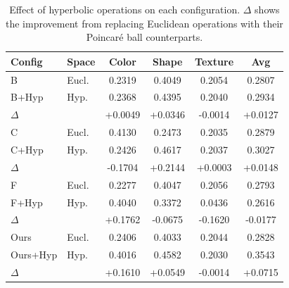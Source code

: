 \begin{table}[t]
\centering
\caption{Effect of hyperbolic operations on each configuration. $\Delta$ shows the improvement from replacing Euclidean operations with their Poincar\'{e} ball counterparts.}
\label{tab:hyperbolic_comparison}
\begin{tabular}{l|l|ccc|c}
\toprule
Config & Space & Color & Shape & Texture & Avg \\
\midrule
B & Eucl. & 0.2319 & 0.4049 & 0.2054 & 0.2807 \\
B+Hyp & Hyp. & 0.2368 & 0.4395 & 0.2040 & 0.2934 \\
$\Delta$ &  & +0.0049 & +0.0346 & -0.0014 & +0.0127 \\
\midrule
C & Eucl. & 0.4130 & 0.2473 & 0.2035 & 0.2879 \\
C+Hyp & Hyp. & 0.2426 & 0.4617 & 0.2037 & 0.3027 \\
$\Delta$ &  & -0.1704 & +0.2144 & +0.0003 & +0.0148 \\
\midrule
F & Eucl. & 0.2277 & 0.4047 & 0.2056 & 0.2793 \\
F+Hyp & Hyp. & 0.4040 & 0.3372 & 0.0436 & 0.2616 \\
$\Delta$ &  & +0.1762 & -0.0675 & -0.1620 & -0.0177 \\
\midrule
Ours & Eucl. & 0.2406 & 0.4033 & 0.2044 & 0.2828 \\
Ours+Hyp & Hyp. & 0.4016 & 0.4582 & 0.2030 & 0.3543 \\
$\Delta$ &  & +0.1610 & +0.0549 & -0.0014 & +0.0715 \\
\bottomrule
\end{tabular}
\end{table}